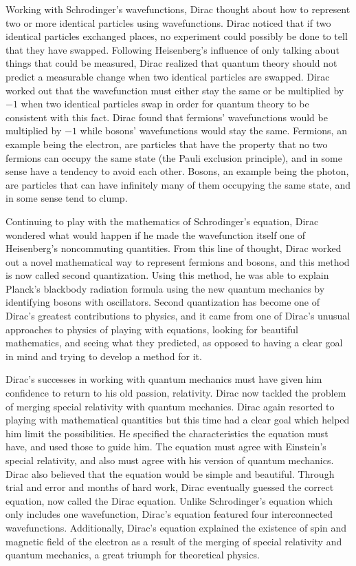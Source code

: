 \documentclass[12pt, oneside, letterpaper, fleqn]{article}
\begin{document}
Working with Schrodinger's wavefunctions, Dirac thought about how to
represent two or more identical particles using wavefunctions. Dirac
noticed that if two identical particles exchanged places, no experiment
could possibly be done to tell that they have swapped. Following
Heisenberg's influence of only talking about things that could be
measured, Dirac realized that quantum theory should not predict a
measurable change when two identical particles are swapped. Dirac worked
out that the wavefunction must either stay the same or be multiplied by
$-1$ when two identical particles swap in order for quantum theory to be
consistent with this fact. Dirac found that fermions' wavefunctions
would be multiplied by $-1$ while bosons' wavefunctions would stay the
same. Fermions, an example being the electron, are particles that have
the property that no two fermions can occupy the same state (the Pauli
exclusion principle), and in some sense have a tendency to avoid each
other.  Bosons, an example being the photon, are particles that can have
infinitely many of them occupying the same state, and in some sense tend
to clump.

Continuing to play with the mathematics of Schrodinger's equation, Dirac
wondered what would happen if he made the wavefunction itself one of
Heisenberg's noncommuting quantities. From this line of thought, Dirac
worked out a novel mathematical way to represent fermions and bosons,
and this method is now called second quantization. Using this method, he
was able to explain Planck's blackbody radiation formula using the new
quantum mechanics by identifying bosons with oscillators. Second
quantization has become one of Dirac's greatest contributions to
physics, and it came from one of Dirac's unusual approaches to physics
of playing with equations, looking for beautiful mathematics, and seeing
what they predicted, as opposed to having a clear goal in mind and
trying to develop a method for it.

Dirac's successes in working with quantum mechanics must have given him
confidence to return to his old passion, relativity. Dirac now tackled
the problem of merging special relativity with quantum mechanics. Dirac
again resorted to playing with mathematical quantities but this time had
a clear goal which helped him limit the possibilities. He specified the
characteristics the equation must have, and used those to guide him. The
equation must agree with Einstein's special relativity, and also must
agree with his version of quantum mechanics. Dirac also believed that
the equation would be simple and beautiful. Through trial and error and
months of hard work, Dirac eventually guessed the correct equation, now
called the Dirac equation. Unlike Schrodinger's equation which only
includes one wavefunction, Dirac's equation featured four interconnected
wavefunctions. Additionally, Dirac's equation explained the existence of
spin and magnetic field of the electron as a result of the merging of
special relativity and quantum mechanics, a great triumph for
theoretical physics.
\end{document}
